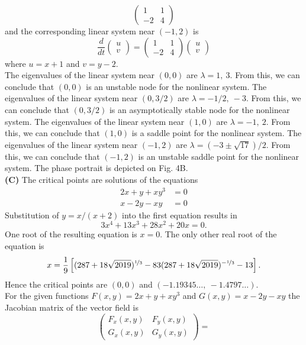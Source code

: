 \documentclass[11pt,a4paper]{article}
\begin{document}
\begin{enumerate}
$$\begin{pmatrix}
			1 & 1\\
			-2 & 4
		\end{pmatrix}
		$$
		and the corresponding linear system near $(-1, 2)$ is
		$$
		\frac{d}{dt}
		\begin{pmatrix}
			u\\
			v
		\end{pmatrix} =
		\begin{pmatrix}
			1 & 1\\
			-2 & 4
		\end{pmatrix}
		\begin{pmatrix}
			u\\
			v
		\end{pmatrix}
		$$
		where $u = x + 1$ and $v = y - 2$.\\
		The eigenvalues of the linear system near $(0, 0)$ are $\lambda = 1,\ 3$. From this, we can conclude that $(0, 0)$ is an unstable node for the nonlinear system. The eigenvalues of the linear system near $(0, 3/2)$ are $\lambda = -1/2,\ -3$. From this, we can conclude that $(0, 3/2)$ is an asymptotically stable node for the nonlinear system. The eigenvalues of the linear system near $(1, 0)$ are $\lambda = -1,\ 2$. From this, we can conclude that $(1, 0)$ is a saddle point for the nonlinear system. The eigenvalues of the linear system near $(-1, 2)$ are $\lambda = (-3 \pm \sqrt{17})/2$. From this, we can conclude that $(-1, 2)$ is an unstable saddle point for the nonlinear system. The phase portrait is depicted on Fig. 4B.\\
		\textbf{(C)} The critical points are solutions of the equations
		\begin{align*}
			2x + y + xy^3 &= 0\\
			x - 2y - xy &= 0
		\end{align*}
		Substitution of $y = x/(x + 2)$ into the first equation results in
		$$
		3x^4 + 13x^3 + 28x^2 + 20x = 0.
		$$
		One root of the resulting equation is $x = 0$. The only other real root of the equation is
		$$
		x = \frac{1}{9}\left[(287 + 18\sqrt{2019})^{\nicefrac{1}{3}} - 83(287 + 18\sqrt{2019})^{-\nicefrac{1}{3}} - 13\right].
		$$
		Hence the critical points are $(0, 0)$ and $(-1.19345\ldots,\ -1.4797\ldots)$.\\
		For the given functions $F(x, y) = 2x + y + xy^3$ and $G(x, y) = x - 2y - xy$ the Jacobian matrix of the vector field is
		$$
		\begin{pmatrix}
			F_x(x, y) & F_y(x, y)\\
			G_x(x, y) & G_y(x, y)
		\end{pmatrix} =
$$
\end{enumerate}
\end{document}
